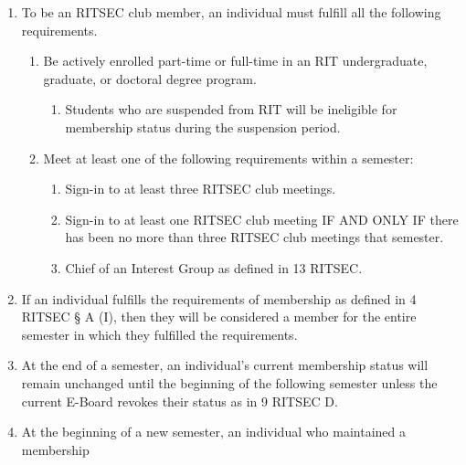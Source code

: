 


\begin{enumerate}
	\item To be an RITSEC club member, an individual must fulfill all the following
	      requirements.
	      \begin{enumerate}
		      \item Be actively enrolled part-time or full-time in an RIT undergraduate, graduate,
		            or doctoral degree program.
		            \begin{enumerate}
			            \item Students who are suspended from RIT will be ineligible for membership status
			                  during the suspension period.
		            \end{enumerate}
		      \item Meet at least one of the following requirements within a semester:
		            \begin{enumerate}
			            \item Sign-in to at least three RITSEC club meetings.
			            \item Sign-in to at least one RITSEC club meeting IF AND ONLY IF there has been no more
			                  than three RITSEC club meetings that semester.
			            \item Chief of an Interest Group as defined in 13 RITSEC\@.
		            \end{enumerate}
	      \end{enumerate}
	\item If an individual fulfills the requirements of membership as defined in 4 RITSEC
	      § A (I), then they will be considered a member for the entire semester in which
	      they fulfilled the requirements.
	\item At the end of a semester, an individual's current membership status will remain
	      unchanged until the beginning of the following semester unless the current
	      E-Board revokes their status as in 9 RITSEC D.
	\item At the beginning of a new semester, an individual who maintained a membership

\end{enumerate}
